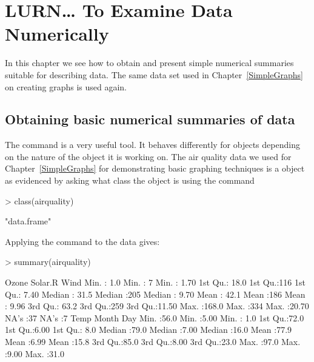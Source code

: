 

 
\chapter{LURN\ldots{} To Examine Data Numerically} 
\label{NumericalEDA} 
 



 
In this chapter we see how to obtain and present simple numerical summaries suitable for describing data. The same data set used in Chapter~\ref{SimpleGraphs} on creating graphs is used again. 
 
\section{Obtaining basic numerical summaries of data} 
 
The  command is a very useful tool. It behaves differently for \R{} objects depending on the nature of the object it is working on. The air quality data we used for Chapter~\ref{SimpleGraphs} for demonstrating basic graphing techniques is a  object as evidenced by asking \R{} what class the object is using the  command 

\begin{Schunk}
\begin{Sinput}
> class(airquality) 
\end{Sinput}
\begin{Soutput}
[1] "data.frame"
\end{Soutput}
\end{Schunk}

 
Applying the  command to the  data gives: 

\begin{Schunk}
\begin{Sinput}
> summary(airquality) 
\end{Sinput}
\begin{Soutput}
     Ozone          Solar.R         Wind      
 Min.   :  1.0   Min.   :  7   Min.   : 1.70  
 1st Qu.: 18.0   1st Qu.:116   1st Qu.: 7.40  
 Median : 31.5   Median :205   Median : 9.70  
 Mean   : 42.1   Mean   :186   Mean   : 9.96  
 3rd Qu.: 63.2   3rd Qu.:259   3rd Qu.:11.50  
 Max.   :168.0   Max.   :334   Max.   :20.70  
 NA's   :37      NA's   :7                    
      Temp          Month           Day      
 Min.   :56.0   Min.   :5.00   Min.   : 1.0  
 1st Qu.:72.0   1st Qu.:6.00   1st Qu.: 8.0  
 Median :79.0   Median :7.00   Median :16.0  
 Mean   :77.9   Mean   :6.99   Mean   :15.8  
 3rd Qu.:85.0   3rd Qu.:8.00   3rd Qu.:23.0  
 Max.   :97.0   Max.   :9.00   Max.   :31.0  
                                             
\end{Soutput}
\end{Schunk}

